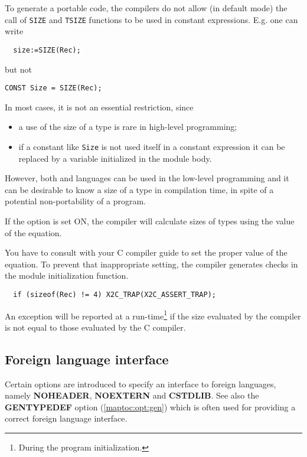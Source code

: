 To  generate  a  portable  code, the \xds{} compilers do not allow (in
default  mode) the  call  of {\tt SIZE} and {\tt TSIZE}
functions to be used in constant expressions. E.g. one can write
\begin{verbatim}
  size:=SIZE(Rec);
\end{verbatim}
but not
\begin{verbatim}
CONST Size = SIZE(Rec);
\end{verbatim}

In most cases, it is not an essential restriction, since
\begin{itemize}
\item   a use of the size of a type is rare in high-level programming;
\item   if a constant like {\tt Size} is not used itself in a constant
        expression it can be replaced by a variable initialized
        in the module body.
\end{itemize}
However,  both \mt{} and \ot{} languages can be used in the low-level
programming  and  it can be desirable to know a size of a type in
compilation  time,  in  spite  of a potential non-portability  of a
program.

If the  option is set ON,
the compiler will calculate sizes of types using the value
of the  equation.

You have to consult with your C compiler guide to set the proper
value of the equation. To prevent that inappropriate setting,        %
the compiler generates checks in the module
initialization function.
\begin{verbatim}
  if (sizeof(Rec) != 4) X2C_TRAP(X2C_ASSERT_TRAP);
\end{verbatim}
An exception will be reported at a run-time\footnote{During the program
initialization.} if the size evaluated by the \xds{} compiler
is not equal to those evaluated by the C compiler.

\subsection{Foreign language interface}\label{maptoc:opt:foreign}

Certain options are introduced to specify an interface to foreign
languages,   namely  {\bf  NOHEADER},  {\bf  NOEXTERN}  and  {\bf
CSTDLIB}.     See    also    the    {\bf    GENTYPEDEF}    option
(\ref{maptoc:opt:gen})  which  is often used for providing a correct
foreign language interface.

